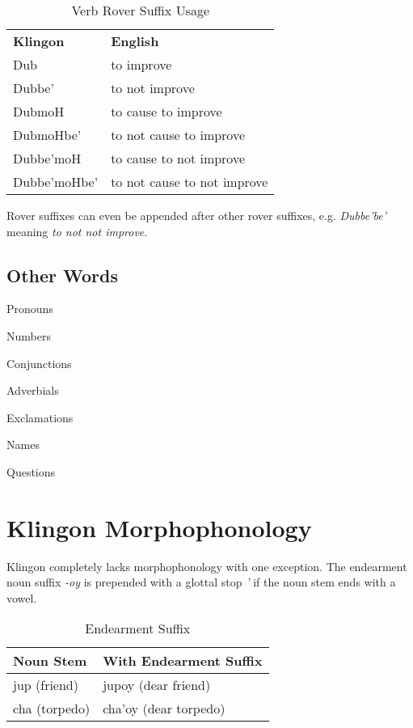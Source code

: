 \documentclass[11pt]{article}
\begin{document}
\begin{table}[h]
\begin{center}
\begin{tabular}{l|l}
\bf Klingon & \bf English \\
Dub & to improve \\
Dubbe' & to not improve \\
DubmoH & to cause to improve \\
DubmoHbe' & to not cause to improve \\
Dubbe'moH & to cause to not improve \\
Dubbe'moHbe' & to not cause to not improve
\end{tabular}
\end{center}
\caption{Verb Rover Suffix Usage }
\end{table}

Rover suffixes can even be appended after other rover suffixes, e.g. \textit{Dubbe'be'} meaning \textit{to not not improve}.

\subsection {Other Words}

Pronouns

Numbers

Conjunctions

Adverbials

Exclamations

Names

Questions

\section{Klingon Morphophonology}

Klingon completely lacks morphophonology with one exception. The endearment noun suffix \textit{-oy} is prepended with a glottal stop \textit{'} if the noun stem ends with a vowel.

\begin{table}[h]
\begin{center}
\begin{tabular}{|l|l|}
\hline \bf Noun Stem & \bf With Endearment Suffix \\ \hline
jup (friend) & jupoy (dear friend) \\
cha (torpedo) & cha'oy (dear torpedo) \\
\hline
\end{tabular}
\end{center}
\caption{Endearment Suffix }
\end{table}
\end{document}
